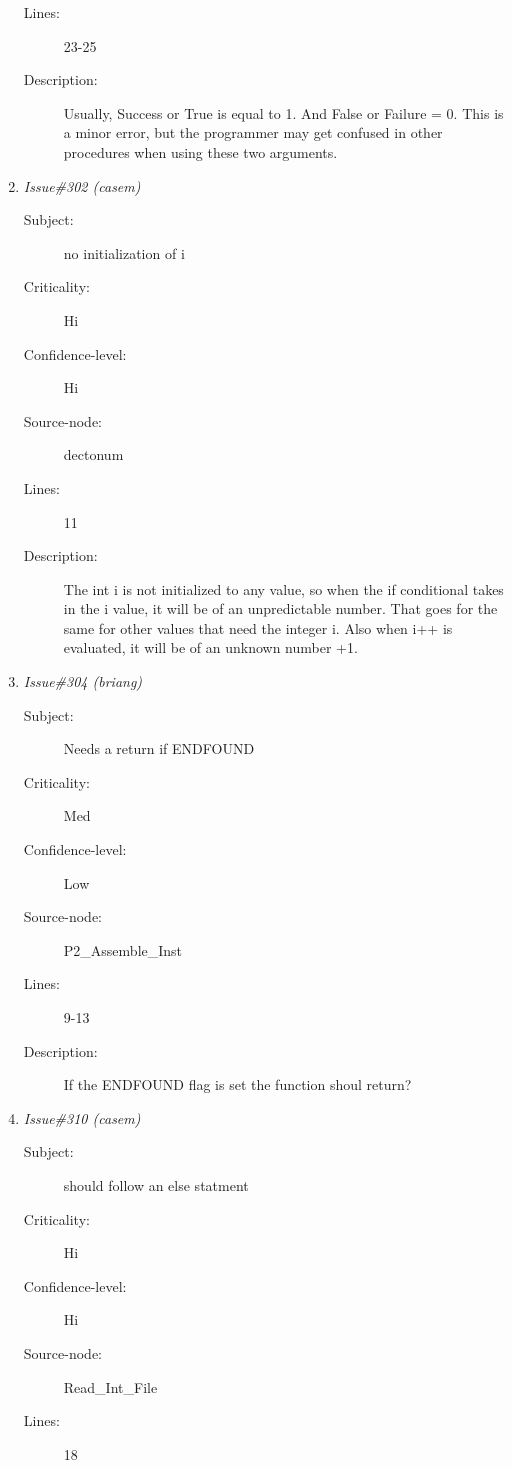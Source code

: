 \begin{enumerate}
\begin{description}
\item [Lines:] 23-25

\item [Description:] Usually, Success or True is equal to 1.  And False or Failure = 0.  This is a
minor error, but the programmer may get confused in other procedures when
using these two arguments.
\end{description}
\item {\it Issue\#302 (casem)}
\begin{description}
\item [Subject:] no initialization of i
\item [Criticality:] Hi
\item [Confidence-level:] Hi
\item [Source-node:] dectonum

\item [Lines:] 11

\item [Description:] The int i is not initialized to any value, so when the if conditional takes
in the i value, it will be of an unpredictable number.  That goes for the
same for other values that need the integer i.  Also when i++ is evaluated,
it will be of an unknown number +1.
\end{description}
\item {\it Issue\#304 (briang)}
\begin{description}
\item [Subject:] Needs a return if ENDFOUND
\item [Criticality:] Med
\item [Confidence-level:] Low
\item [Source-node:] P2\_Assemble\_Inst

\item [Lines:] 9-13

\item [Description:] If the ENDFOUND flag is set the function shoul return?
\end{description}
\item {\it Issue\#310 (casem)}
\begin{description}
\item [Subject:] should follow an else statment
\item [Criticality:] Hi
\item [Confidence-level:] Hi
\item [Source-node:] Read\_Int\_File

\item [Lines:] 18


\end{description}
\end{enumerate}
